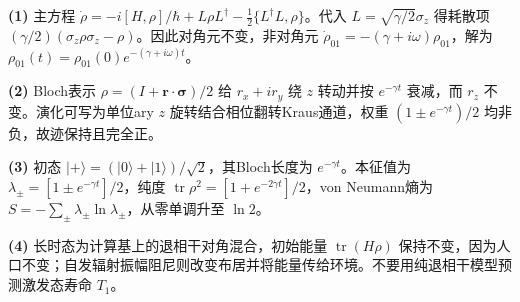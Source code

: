 \par\noindent\textbf{(1)} 主方程 \(\dot\rho=-i[H,\rho]/\hbar+L\rho L^\dagger-\tfrac12\{L^\dagger L,\rho\}\)。代入 \(L=\sqrt{\gamma/2}\sigma_z\) 得耗散项 \((\gamma/2)(\sigma_z\rho\sigma_z-\rho)\)。因此对角元不变，非对角元 \(\dot\rho_{01}=-(\gamma+i\omega)\rho_{01}\)，解为 \(\rho_{01}(t)=\rho_{01}(0)e^{-(\gamma+i\omega)t}\)。
\par\noindent\textbf{(2)} Bloch表示 \(\rho=(I+\boldsymbol r\cdot\boldsymbol\sigma)/2\) 给 \(r_x+ir_y\) 绕 \(z\) 转动并按 \(e^{-\gamma t}\) 衰减，而 \(r_z\) 不变。演化可写为单位ary \(z\) 旋转结合相位翻转Kraus通道，权重 \((1\pm e^{-\gamma t})/2\) 均非负，故迹保持且完全正。
\par\noindent\textbf{(3)} 初态 \(|+\rangle=(|0\rangle+|1\rangle)/\sqrt2\)，其Bloch长度为 \(e^{-\gamma t}\)。本征值为 \(\lambda_\pm=[1\pm e^{-\gamma t}]/2\)，纯度 \(\operatorname{tr}\rho^2=[1+e^{-2\gamma t}]/2\)，von Neumann熵为 \(S=-\sum_\pm\lambda_\pm\ln\lambda_\pm\)，从零单调升至 \(\ln2\)。
\par\noindent\textbf{(4)} 长时态为计算基上的退相干对角混合，初始能量 \(\operatorname{tr}(H\rho)\) 保持不变，因为人口不变；自发辐射振幅阻尼则改变布居并将能量传给环境。不要用纯退相干模型预测激发态寿命 \(T_1\)。
